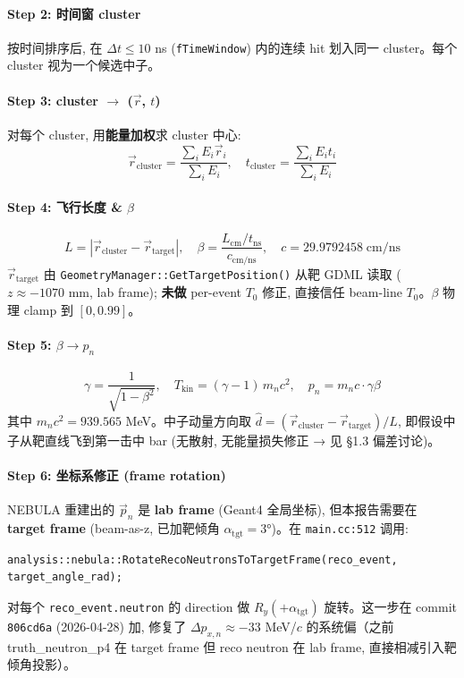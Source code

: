 \documentclass[a4paper,11pt]{article}
\begin{document}
\paragraph{Step 2: 时间窗 cluster}
按时间排序后, 在 $\Delta t \le 10$ ns (\texttt{fTimeWindow}) 内的连续 hit 划入同一 cluster。每个 cluster 视为一个候选中子。

\paragraph{Step 3: cluster $\to$ ($\vec r$, $t$)}
对每个 cluster, 用\textbf{能量加权}求 cluster 中心:
\[
  \vec r_\text{cluster} = \frac{\sum_i E_i \vec r_i}{\sum_i E_i}, \quad t_\text{cluster} = \frac{\sum_i E_i t_i}{\sum_i E_i}
\]

\paragraph{Step 4: 飞行长度 \& $\beta$}
\[
  L = |\vec r_\text{cluster} - \vec r_\text{target}|, \quad \beta = \frac{L_\text{cm}/t_\text{ns}}{c_\text{cm/ns}}, \quad c = 29.9792458\;\text{cm/ns}
\]
$\vec r_\text{target}$ 由 \texttt{GeometryManager::GetTargetPosition()} 从靶 GDML 读取 ($z \approx -1070$ mm, lab frame); \textbf{未做} per-event $T_0$ 修正, 直接信任 beam-line $T_0$。$\beta$ 物理 clamp 到 $[0, 0.99]$。

\paragraph{Step 5: $\beta \to p_n$}
\[
  \gamma = \frac{1}{\sqrt{1-\beta^2}}, \quad T_\text{kin} = (\gamma - 1)\,m_n c^2, \quad p_n = m_n c \cdot \gamma\beta
\]
其中 $m_n c^2 = 939.565$ MeV。中子动量方向取 $\hat d = (\vec r_\text{cluster} - \vec r_\text{target})/L$, 即假设中子从靶直线飞到第一击中 bar (无散射, 无能量损失修正 → 见 §1.3 偏差讨论)。

\paragraph{Step 6: 坐标系修正 (frame rotation)}
NEBULA 重建出的 $\vec p_n$ 是 \textbf{lab frame} (Geant4 全局坐标), 但本报告需要在 \textbf{target frame} (beam-as-z, 已加靶倾角 $\alpha_\text{tgt} = 3°$)。在 \texttt{main.cc:512} 调用:
\begin{verbatim}
analysis::nebula::RotateRecoNeutronsToTargetFrame(reco_event, target_angle_rad);
\end{verbatim}
对每个 \texttt{reco\_event.neutron} 的 direction 做 $R_y(+\alpha_\text{tgt})$ 旋转。这一步在 commit \texttt{806cd6a} (2026-04-28) 加, 修复了 $\Delta p_{x,n} \approx -33$ MeV/$c$ 的系统偏（之前 truth\_neutron\_p4 在 target frame 但 reco neutron 在 lab frame, 直接相减引入靶倾角投影）。
\end{document}
